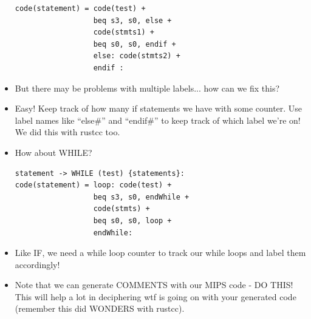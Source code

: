 \documentclass[12pt]{article}
\begin{document}
\begin{itemize}
\begin{lstlisting}[mathescape, numbers=none, breaklines=true]
code(statement) = code(test) +
                  beq s3, s0, else +
                  code(stmts1) +
                  beq s0, s0, endif +
                  else: code(stmts2) + 
                  endif :
\end{lstlisting}
    \item But there may be problems with multiple labels... how can we fix this?
    \item Easy!  Keep track of how many if statements we have with some counter.  Use label names like ``else\#'' and ``endif\#'' to keep track of which label we're on!  We did this with rustcc too.
    \item How about WHILE?
\begin{lstlisting}[mathescape, numbers=none, breaklines=true]
statement -> WHILE (test) {statements}:
code(statement) = loop: code(test) +
                  beq s3, s0, endWhile +
                  code(stmts) +
                  beq s0, s0, loop +
                  endWhile:
\end{lstlisting}
    \item Like IF, we need a while loop counter to track our while loops and label them accordingly!
    \item Note that we can generate COMMENTS with our MIPS code - DO THIS!  This will help a lot in deciphering wtf is going on with your generated code (remember this did WONDERS with rustcc).
\end{itemize}
\end{document}
